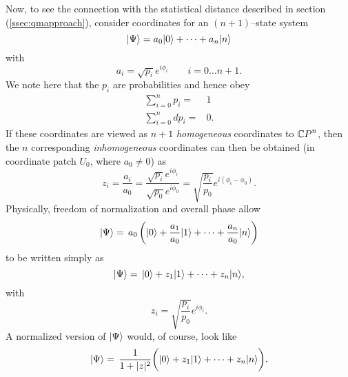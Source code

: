 Now, to see the connection with the statistical distance described
in section (\ref{ssec:qmapproach}),
consider coordinates for an $(n+1)$--state system
\begin{equation}
{|{\Psi}\rangle} = a_0{|{0}\rangle} + \cdots + a_n{|{n}\rangle}
\end{equation} 
with
\begin{equation}
a_i = \sqrt{p_i}e^{i\phi_i}\qquad i=0\ldots n+1.
\end{equation}
We note here that the $p_i$ are probabilities and hence obey
\begin{equation}
\begin{split}
\sum_{i=0}^{n} p_i =& 1\\
\sum_{i=0}^{n} dp_i =& 0.
\end{split}
\end{equation}
If these coordinates are viewed as $n+1$ \emph{homogeneous}
coordinates to ${\mathbb{C} P}^{n}$, then the $n$ corresponding 
\emph{inhomogeneous} coordinates can then be obtained
(in coordinate patch $U_0$, where $a_0\ne 0$) as
\begin{equation}
z_i = \frac{a_i}{a_0} = \frac{ \sqrt{p_i}e^{i\phi_i} }
                             { \sqrt{p_0}e^{i\phi_0} }
= \sqrt{\frac{p_i}{p_0}} e^{i(\phi_i - \phi_0)}.
\label{e:inhomoA}
\end{equation}
Physically, freedom of normalization and overall phase allow
\begin{equation} 
{|{\Psi}\rangle} =\, a_0\left( {|{0}\rangle} + \frac{a_1}{a_0}{|{1}\rangle} + \cdots 
                        + \frac{a_n}{a_0}{|{n}\rangle}
                \right)
\end{equation}
to be written simply as
\begin{equation}
{|{\Psi}\rangle}  =\, {|{0}\rangle} + z_1{|{1}\rangle} + \cdots + z_n{|{n}\rangle},
\end{equation}
with
\begin{equation}
z_i = \sqrt{\frac{p_i}{p_0}} e^{i\phi_i}.
\label{e:inhomoB}
\end{equation}
A normalized version of ${|{\Psi}\rangle}$ would, of course, look like
\begin{equation}
{|{\Psi}\rangle} =\, \frac{1}{1+|z|^2}\biggl( {|{0}\rangle} + z_1{|{1}\rangle} + \cdots + z_n{|{n}\rangle}
                        \biggr). 
\end{equation}

